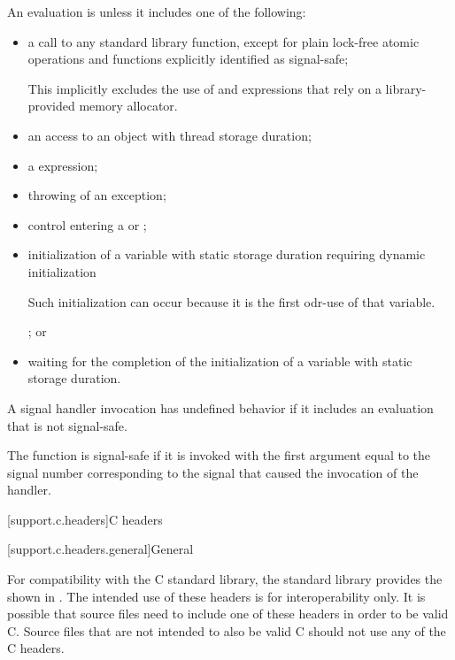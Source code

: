 \pnum
{}%
An evaluation is  unless it includes one of the following:
\begin{itemize}
\item
a call to any standard library function,
except for plain lock-free atomic operations and
functions explicitly identified as signal-safe;
\begin{note}
This implicitly excludes the use of  and  expressions
that rely on a library-provided memory allocator.
\end{note}

\item
an access to an object with thread storage duration;

\item
a  expression;

\item
throwing of an exception;

\item
control entering a  or ;

\item
initialization of a variable with static storage duration
requiring dynamic initialization
\begin{footnote}
Such initialization can occur because it is the first odr-use of that variable.
\end{footnote}
; or

\item
waiting for the completion of the initialization of a variable with static storage duration.
\end{itemize}

A signal handler invocation has undefined behavior if it includes
an evaluation that is not signal-safe.

\pnum
{}%
The function  is signal-safe if it is invoked
with the first argument equal to the signal number
corresponding to the signal that caused the invocation of the handler.


[support.c.headers]{C headers}

[support.c.headers.general]{General}

\pnum
For compatibility with the
%
C standard library, the \Cpp{} standard library provides
the  shown in .
The intended use of these headers is for interoperability only.
It is possible that \Cpp{} source files need to include
one of these headers in order to be valid C.
Source files that are not intended to also be valid C
should not use any of the C headers.


